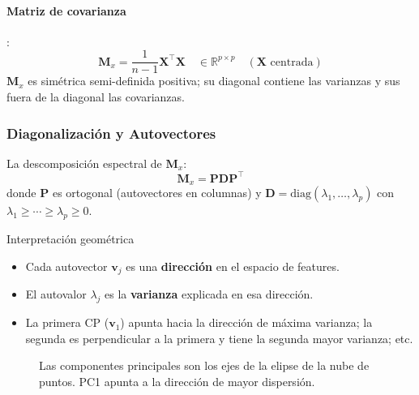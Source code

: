 \documentclass[12pt, a4paper]{article}
\newcommand{\R}{\mathbb{R}}
\begin{document}
\paragraph{Matriz de covarianza}:
\[
  \mathbf{M}_x = \frac{1}{n-1}\mathbf{X}^\top\mathbf{X}
  \quad\in\R^{p\times p} \quad (\mathbf{X} \text{ centrada})
\]
$\mathbf{M}_x$ es simétrica semi-definida positiva; su diagonal contiene las varianzas
y sus fuera de la diagonal las covarianzas.

\subsubsection{Diagonalización y Autovectores}

La descomposición espectral de $\mathbf{M}_x$:
\[
  \mathbf{M}_x = \mathbf{P}\mathbf{D}\mathbf{P}^\top
\]
donde $\mathbf{P}$ es ortogonal (autovectores en columnas) y
$\mathbf{D} = \text{diag}(\lambda_1, \ldots, \lambda_p)$ con $\lambda_1 \geq \cdots \geq \lambda_p \geq 0$.

\begin{defbox}{Interpretación geométrica}
  \begin{itemize}
    \item Cada autovector $\mathbf{v}_j$ es una \textbf{dirección} en el espacio de features.
    \item El autovalor $\lambda_j$ es la \textbf{varianza} explicada en esa dirección.
    \item La primera CP ($\mathbf{v}_1$) apunta hacia la dirección de máxima varianza;
          la segunda es perpendicular a la primera y tiene la segunda mayor varianza; etc.
  \end{itemize}
\end{defbox}

\begin{figure}[H]
\centering
{}
\caption{Las componentes principales son los ejes de la elipse de la nube de puntos.
         PC1 apunta a la dirección de mayor dispersión.}
\end{figure}
\end{document}
